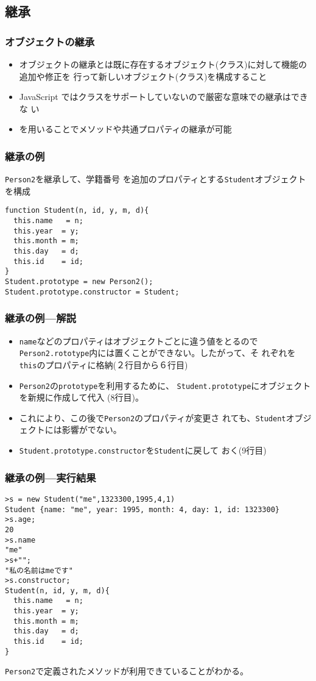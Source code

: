 \documentclass[dvipsk]{beamer}
\begin{document}
\subsection{継承}
\begin{frame}[containsverbatim]
 \frametitle{オブジェクトの継承}
 \begin{itemize}
  \item オブジェクトの継承とは既に存在するオブジェクト(クラス)に対して機能の追加や修正を
        行って新しいオブジェクト(クラス)を構成すること
  \item JavaScript ではクラスをサポートしていないので厳密な意味での継承はできな
        い
  \item {}を用いることでメソッドや共通プロパティの継承が可能
 \end{itemize}
 \end{frame}
\begin{frame}[containsverbatim]
 \frametitle{継承の例}
 \texttt{Person2}を継承して、学籍番号
 を追加のプロパティとする\texttt{Student}オブジェクトを構成
\begin{verbatim}
function Student(n, id, y, m, d){
  this.name   = n;
  this.year  = y;
  this.month = m;
  this.day   = d;
  this.id    = id;
}
Student.prototype = new Person2();
Student.prototype.constructor = Student;
\end{verbatim}
\end{frame}
\begin{frame}[containsverbatim]
 \frametitle{継承の例---解説}
 \begin{itemize}
 \item \texttt{name}などのプロパティはオブジェクトごとに違う値をとるので
       \texttt{Person2.rototype}内には置くことができない。したがって、そ
       れぞれを\texttt{this}のプロパティに格納(２行目から６行目)
 \item \texttt{Person2}の\texttt{prototype}を利用するために、
       \texttt{Student.prototype}にオブジェクトを新規に作成して代入
       (8行目)。
  \item これにより、この後で\texttt{Person2}のプロパティが変更さ
       れても、\texttt{Student}オブジェクトには影響がでない。
 \item \texttt{Student.prototype.constructor}を\texttt{Student}に戻して
       おく(9行目)
\end{itemize}
\end{frame}
\begin{frame}[containsverbatim]
 \frametitle{継承の例---実行結果}
\begin{verbatim}
>s = new Student("me",1323300,1995,4,1)
Student {name: "me", year: 1995, month: 4, day: 1, id: 1323300}
>s.age;
20
>s.name
"me"
>s+"";
"私の名前はmeです"
>s.constructor;
Student(n, id, y, m, d){
  this.name   = n;
  this.year  = y;
  this.month = m;
  this.day   = d;
  this.id    = id;
}
\end{verbatim}
\texttt{Person2}で定義されたメソッドが利用できていることがわかる。
\end{frame}
\end{document}
